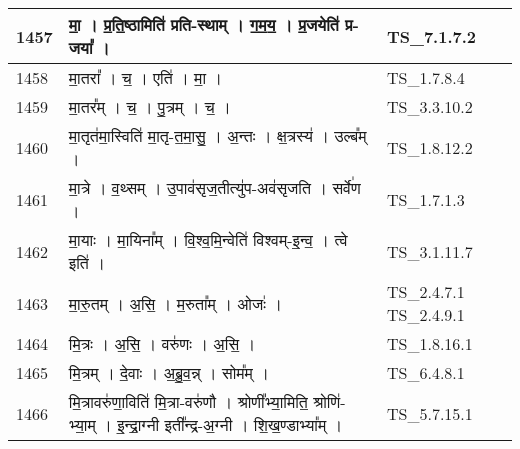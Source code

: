 \documentclass[17pt]{extarticle}
\begin{document}
\begin{longtable}{||p{0.4in}||p{4.9in}||p{0.9in}||}
    \hline
        
    1457 & मा॒   ।   प्र॒ति॒ष्ठामिति॑ प्रति{-}स्थाम्   ।   ग॒म॒य॒   ।   प्र॒जयेति॑ प्र{-}जया᳚   ।    & TS\_7.1.7.2       \\
    
    \hline
        
    1458 & मा॒तरा᳚   ।   च॒   ।   एति॑   ।   मा॒   ।    & TS\_1.7.8.4       \\
    
    \hline
        
    1459 & मा॒तर᳚म्   ।   च॒   ।   पु॒त्रम्   ।   च॒   ।    & TS\_3.3.10.2       \\
    
    \hline
        
    1460 & मा॒तृत॑मा॒स्विति॑ मा॒तृ{-}त॒मा॒सु॒   ।   अ॒न्तः   ।   क्ष॒त्रस्य॑   ।   उल्ब᳚म्   ।    & TS\_1.8.12.2       \\
    
    \hline
        
    1461 & मा॒त्रे   ।   व॒थ्सम्   ।   उ॒पाव॑सृज॒तीत्यु॑प{-}अव॑सृजति   ।   सर्वे॑ण   ।    & TS\_1.7.1.3       \\
    
    \hline
        
    1462 & मा॒याः   ।   मा॒यिना᳚म्   ।   वि॒श्व॒मि॒न्वेति॑ विश्वम्{-}इ॒न्व॒   ।   त्वे इति॑   ।    & TS\_3.1.11.7       \\
    
    \hline
        
    1463 & मा॒रु॒तम्   ।   अ॒सि॒   ।   म॒रुता᳚म्   ।   ओजः॑   ।    & TS\_2.4.7.1 TS\_2.4.9.1       \\
    
    \hline
        
    1464 & मि॒त्रः   ।   अ॒सि॒   ।   वरु॑णः   ।   अ॒सि॒   ।    & TS\_1.8.16.1       \\
    
    \hline
        
    1465 & मि॒त्रम्   ।   दे॒वाः   ।   अ॒ब्रु॒व॒न्न्   ।   सोम᳚म्   ।    & TS\_6.4.8.1       \\
    
    \hline
        
    1466 & मि॒त्रावरु॑णा॒विति॑ मि॒त्रा{-}वरु॑णौ   ।   श्रोणी᳚भ्या॒मिति॒ श्रोणि॑{-}भ्या॒म्   ।   इ॒न्द्रा॒ग्नी इती᳚न्द्र{-}अ॒ग्नी   ।   शि॒ख॒ण्डाभ्या᳚म्   ।    & TS\_5.7.15.1       \\
    
    \hline
        

\end{longtable}
\end{document}
